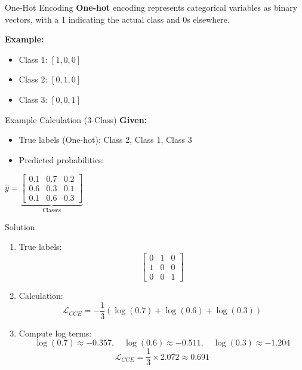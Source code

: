 \documentclass[serif, aspectratio=169]{beamer}
\begin{document}
\begin{frame}{One-Hot Encoding}
    \textbf{One-hot} encoding represents categorical variables as binary vectors, with a 1 indicating the actual class and 0s elsewhere.
    
    \textbf{Example:} \\
    \begin{itemize}
        \item Class 1: \([1, 0, 0]\)
        \item Class 2: \([0, 1, 0]\)
        \item Class 3: \([0, 0, 1]\)
    \end{itemize}
\end{frame}
\begin{frame}{Example Calculation (3-Class)}
    \textbf{Given:}
    \begin{itemize}
        \item True labels (One-hot): Class 2, Class 1, Class 3
        \item Predicted probabilities:
    \end{itemize}
    \begin{center}
        \(\hat{y} = \underbrace{\begin{bmatrix} 
            0.1 & 0.7 & 0.2 \\ 
            0.6 & 0.3 & 0.1 \\ 
            0.1 & 0.6 & 0.3 
            \end{bmatrix}}_{\text{Classes}}\)
        \quad {}
    \end{center} 
\end{frame}



\begin{frame}{Solution}
    \begin{enumerate}
        \item True labels:
        \[
        \begin{bmatrix} 
        0 & 1 & 0 \\ 
        1 & 0 & 0 \\ 
        0 & 0 & 1 
        \end{bmatrix}
        \]
        \item Calculation:
        \[
        \mathcal{L}_{CCE} = -\frac{1}{3} \left( \log(0.7) + \log(0.6) + \log(0.3) \right)
        \]
        \item Compute log terms:
            \[
            \log(0.7) \approx -0.357, \quad \log(0.6) \approx -0.511, \quad \log(0.3) \approx -1.204
            \]
            \[
           \mathcal{L}_{CCE} = \frac{1}{3} \times 2.072 \approx 0.691
            \]
    \end{enumerate}
\end{frame}
\end{document}

